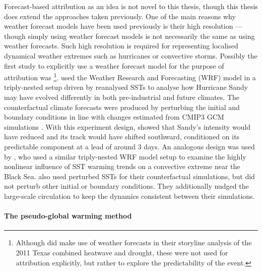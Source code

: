     Forecast-based attribution as an idea is not novel to this thesis, though this thesis does extend the approaches taken previously. One of the main reasons why weather forecast models have been used previously is their high resolution --- though simply using weather forecast models is not necessarily the same as using weather forecasts. Such high resolution is required for representing localised dynamical weather extremes such as hurricanes or convective storms. Possibly the first study to explicitly use a weather forecast model for the purpose of attribution was \citet{lackmann_hurricane_2015} \footnote{Although \citet{hoerling_anatomy_2013} did make use of weather forecasts in their storyline analysis of the 2011 Texas combined heatwave and drought, these were not used for attribution explicitly, but rather to explore the predictability of the event.}. \citeauthor[]{lackmann_hurricane_2015} used the Weather Research and Forecasting (WRF) model \citep{skamarock_description_2005} in a triply-nested setup driven by reanalysed SSTs to analyse how Hurricane Sandy may have evolved differently in both pre-industrial and future climates. The counterfactual climate forecasts were produced by perturbing the initial and boundary conditions in line with changes estimated from CMIP3 GCM simulations \citep{meehl_wcrp_2007}. With this experiment design, \citeauthor{lackmann_hurricane_2015} showed that Sandy's intensity would have reduced and its track would have shifted southward, conditioned on its predictable component at a lead of around 3 days. An analogous design was used by \citet{meredith_crucial_2015}, who used a similar triply-nested WRF model setup to examine the highly nonlinear influence of SST warming trends on a convective extreme near the Black Sea. \citeauthor{meredith_crucial_2015} also used perturbed SSTs for their counterfactual simulations, but did not perturb other initial or boundary conditions. They additionally nudged the large-scale circulation to keep the dynamics consistent between their simulations. 

  \paragraph*{The pseudo-global warming method}

